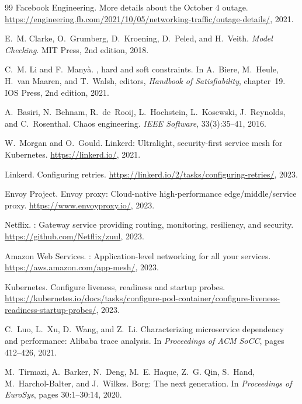 \documentclass[10pt,twocolumn]{article}
\begin{document}
\begin{thebibliography}{99}
Facebook Engineering.
\newblock More details about the {October 4} outage.
\newblock \url{https://engineering.fb.com/2021/10/05/networking-traffic/outage-details/}, 2021.

E.~M. Clarke, O.~Grumberg, D.~Kroening, D.~Peled, and H.~Veith.
\newblock \emph{Model Checking}.
\newblock MIT Press, 2nd edition, 2018.

C.~M. Li and F.~Many\`{a}.
, hard and soft constraints.
\newblock In A.~Biere, M.~Heule, H.~van Maaren, and T.~Walsh, editors,
  \emph{Handbook of Satisfiability}, chapter~19. IOS Press, 2nd edition, 2021.

A.~Basiri, N.~Behnam, R.~de~Rooij, L.~Hochstein, L.~Kosewski, J.~Reynolds,
  and C.~Rosenthal.
\newblock Chaos engineering.
\newblock \emph{IEEE Software}, 33(3):35--41, 2016.

W.~Morgan and O.~Gould.
\newblock Linkerd: Ultralight, security-first service mesh for {Kubernetes}.
\newblock \url{https://linkerd.io/}, 2021.

Linkerd.
\newblock Configuring retries.
\newblock \url{https://linkerd.io/2/tasks/configuring-retries/}, 2023.

Envoy Project.
\newblock Envoy proxy: Cloud-native high-performance edge/middle/service proxy.
\newblock \url{https://www.envoyproxy.io/}, 2023.

Netflix.
: Gateway service providing routing, monitoring, resiliency,
  and security.
\newblock \url{https://github.com/Netflix/zuul}, 2023.

Amazon Web Services.
: Application-level networking for all your services.
\newblock \url{https://aws.amazon.com/app-mesh/}, 2023.

Kubernetes.
\newblock Configure liveness, readiness and startup probes.
\newblock \url{https://kubernetes.io/docs/tasks/configure-pod-container/configure-liveness-readiness-startup-probes/}, 2023.

C.~Luo, L.~Xu, D.~Wang, and Z.~Li.
\newblock Characterizing microservice dependency and performance: {Alibaba}
  trace analysis.
\newblock In \emph{Proceedings of ACM SoCC}, pages 412--426, 2021.

M.~Tirmazi, A.~Barker, N.~Deng, M.~E. Haque, Z.~G. Qin, S.~Hand,
  M.~Harchol-Balter, and J.~Wilkes.
\newblock Borg: The next generation.
\newblock In \emph{Proceedings of EuroSys}, pages 30:1--30:14, 2020.


\end{thebibliography}
\end{document}
